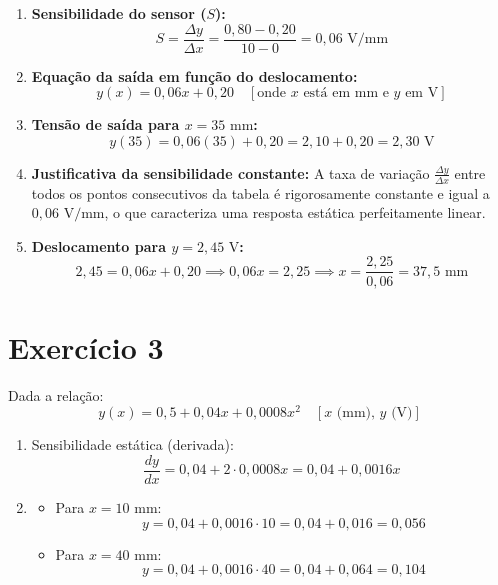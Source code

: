 \begin{enumerate}
    \item[\textbf{a)}] \textbf{Sensibilidade do sensor ($S$):}
    \[
    S = \frac{\Delta y}{\Delta x} = \frac{0{,}80 - 0{,}20}{10 - 0} = 0{,}06\text{ V/mm}
    \]

    \item[\textbf{b)}] \textbf{Equação da saída em função do deslocamento:}
    \[
    y(x) = 0{,}06x + 0{,}20 \quad [\text{onde } x \text{ está em mm e } y \text{ em V}]
    \]

    \item[\textbf{c)}] \textbf{Tensão de saída para $x = 35\text{ mm}$:}
    \[
    y(35) = 0{,}06(35) + 0{,}20 = 2{,}10 + 0{,}20 = 2{,}30\text{ V}
    \]

    \item[\textbf{d)}] \textbf{Justificativa da sensibilidade constante:}
    A taxa de variação $\frac{\Delta y}{\Delta x}$ entre todos os pontos consecutivos da tabela é rigorosamente constante e igual a $0{,}06\text{ V/mm}$, o que caracteriza uma resposta estática perfeitamente linear.

    \item[\textbf{e)}] \textbf{Deslocamento para $y = 2{,}45\text{ V}$:}
    \[
    2{,}45 = 0{,}06x + 0{,}20 \implies 0{,}06x = 2{,}25 \implies x = \frac{2{,}25}{0{,}06} = 37{,}5\text{ mm}
    \]
\end{enumerate}

\section*{Exercício 3}

Dada a relação:
\[
y(x) = 0{,}5 + 0{,}04x + 0{,}0008x^2 \quad \left[x \text{ (mm)}, \, y \text{ (V)}\right]
\]

\begin{enumerate}
    \item[\textbf{a)}] Sensibilidade estática (derivada):
    \[
    \frac{dy}{dx} = 0{,}04 + 2 \cdot 0{,}0008x = 0{,}04 + 0{,}0016x
    \]

    \item[\textbf{b)}] 
    \begin{itemize}
        \item Para $x = 10\text{ mm}$:
        \[
        y = 0{,}04 + 0{,}0016 \cdot 10 = 0{,}04 + 0{,}016 = 0{,}056
        \]
        \item Para $x = 40\text{ mm}$:
        \[
        y = 0{,}04 + 0{,}0016 \cdot 40 = 0{,}04 + 0{,}064 = 0{,}104
        \]
    \end{itemize}
\end{enumerate}

